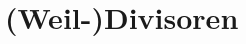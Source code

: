 \section{(Weil-)Divisoren}
\begin{comment}
Aus dem Schematheorie Skript:
\begin{defn}
Sei $X$ noethersch.
\begin{enumerate}
\item
Ein \emph{Primzykel in $X$} ist eine irreduzible, abgeschlossene
Teilmenge.
\item
Ein \emph{Zykel in $X$} ist ein Element der abelschen Gruppe
\[\Z^{(X)} := \{Z = \sum_{x\in X} n_x \bar{\{x\}} \mid
    n_x \in \Z,\ n_x = 0\text{ für fast alle }x\}.\]
\item
Für $Z = \sum n_x \bar{\{x\}}$ heißt
\[ \supp Z := \bigcup_{x\in X\atop n_x\neq 0}\]
der \emph{Träger von $Z$}.
\item
Ein Zykel $Z$ heißt von \emph{Kodimension 1}, wenn alle $x$ mit
$n_x \neq 0$ von Kodimension 1 sind, d.h. 
$\codim_X \bar{\{x\}} = 1$. Äquivalent dazu ist zu fordern, dass
$\dim \O_{X,x} = 1$.\\
$Z^1(X) \subseteq \Z^{(X)}$ bezeichne die Untergruppe dieser.
\end{enumerate}
\end{defn}

\begin{defn}[Weil-Divisoren]
    Sei $X$ noethersch und integer, so heißt $Z^1(X)$ die Gruppe der
    \emph{Weil-Divisoren}.
\end{defn}
%
\begin{defn}[(Effectiver) Divisor]
Ein \emph{(effektiver) Divisor} ist...
\end{defn}
%

\end{comment}

%
